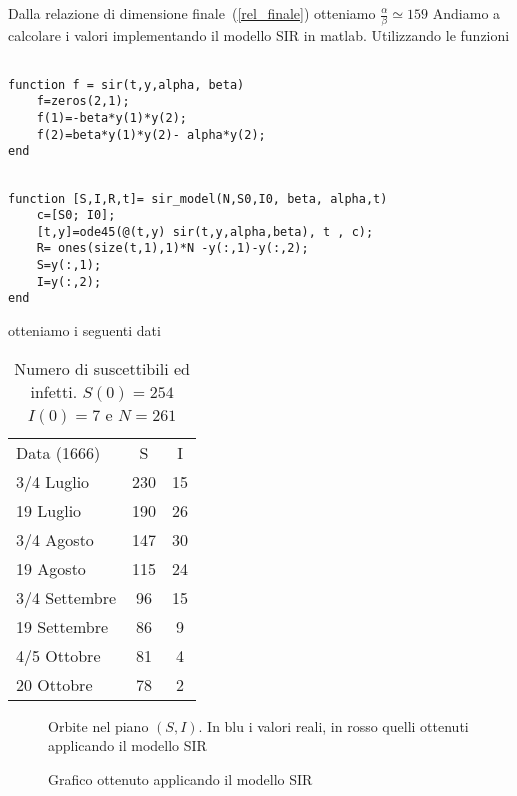Dalla relazione di dimensione finale~(\ref{rel_finale}) otteniamo $\frac{\alpha}{\beta} \simeq 159$
\newpage
Andiamo a calcolare i valori implementando il modello SIR in matlab. Utilizzando le funzioni


\begin{lstlisting}
	
function f = sir(t,y,alpha, beta)
	f=zeros(2,1);
	f(1)=-beta*y(1)*y(2);
	f(2)=beta*y(1)*y(2)- alpha*y(2);
end
\end{lstlisting}
\begin{lstlisting}

function [S,I,R,t]= sir_model(N,S0,I0, beta, alpha,t)
	c=[S0; I0];
	[t,y]=ode45(@(t,y) sir(t,y,alpha,beta), t , c);
	R= ones(size(t,1),1)*N -y(:,1)-y(:,2);
	S=y(:,1);
	I=y(:,2);
end

\end{lstlisting}
otteniamo i seguenti dati 

\begin{table}[!h]
\centering
\caption{Numero di suscettibili ed infetti. $S(0) = 254$ $I(0) = 7$ e $N = 261$ }	
\label{table::2}
\begin{tabular}{l|c|c}

Data (1666) & S & I\\
\cline{1-3}
3/4 Luglio  & 230& 15\\
19 Luglio  & 190 & 26\\
3/4 Agosto  & 147& 30\\
19  Agosto  & 115& 24\\
3/4 Settembre  & 96&  15\\
19 Settembre  & 86& 9\\
4/5 Ottobre  & 81& 4\\
20 Ottobre  & 78& 2\\
 
\end{tabular}
\end{table}
\begin{figure}
\centering

\caption{Orbite nel piano $(S,I)$.  In blu i valori reali,  in rosso quelli ottenuti applicando il modello SIR}
\end{figure}

\begin{figure}
\centering

\caption{Grafico ottenuto applicando il modello SIR}
\end{figure}

